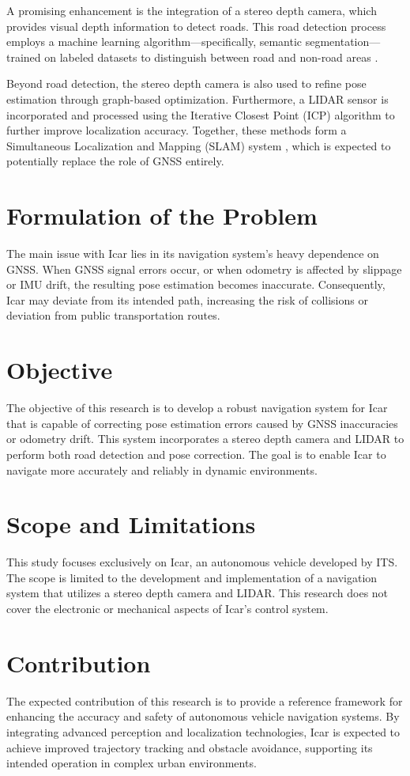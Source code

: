   \par
  A promising enhancement is the integration of a stereo depth camera, which provides visual depth information to detect roads. This road detection process employs a machine learning algorithm—specifically, semantic segmentation—trained on labeled datasets to distinguish between road and non-road areas \cite{ref_mas_pandu}.
  
  \par 
  Beyond road detection, the stereo depth camera is also used to refine pose estimation through graph-based optimization. Furthermore, a LIDAR sensor is incorporated and processed using the Iterative Closest Point (ICP) algorithm to further improve localization accuracy. Together, these methods form a Simultaneous Localization and Mapping (SLAM) system \cite{thrun2005probabilistic}, which is expected to potentially replace the role of GNSS entirely.
  
  \section{Formulation of the Problem}
  The main issue with Icar lies in its navigation system's heavy dependence on GNSS. When GNSS signal errors occur, or when odometry is affected by slippage or IMU drift, the resulting pose estimation becomes inaccurate. Consequently, Icar may deviate from its intended path, increasing the risk of collisions or deviation from public transportation routes.
  
  \section{Objective}
  The objective of this research is to develop a robust navigation system for Icar that is capable of correcting pose estimation errors caused by GNSS inaccuracies or odometry drift. This system incorporates a stereo depth camera and LIDAR to perform both road detection and pose correction. The goal is to enable Icar to navigate more accurately and reliably in dynamic environments.
  
  \section{Scope and Limitations}
  This study focuses exclusively on Icar, an autonomous vehicle developed by ITS. The scope is limited to the development and implementation of a navigation system that utilizes a stereo depth camera and LIDAR. This research does not cover the electronic or mechanical aspects of Icar’s control system.
  
  \section{Contribution}
  The expected contribution of this research is to provide a reference framework for enhancing the accuracy and safety of autonomous vehicle navigation systems. By integrating advanced perception and localization technologies, Icar is expected to achieve improved trajectory tracking and obstacle avoidance, supporting its intended operation in complex urban environments.
  